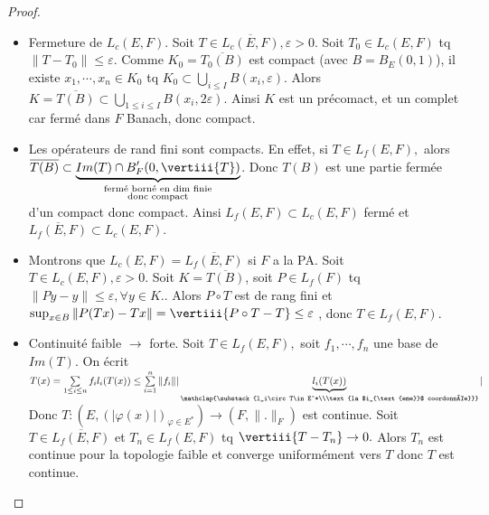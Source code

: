 \begin{proof}
    \begin{itemize}
        \item Fermeture de $L_c(E,F)$. Soit $T\in \overline{L_c(E,F)}, \varepsilon >0$. Soit $T_0\in L_c(E,F)$ tq $\|T-T_0\|\le \varepsilon .$ Comme $K_0=\overline{T_0(B)}$ est compact (avec $B=B_E(0,1)$), il existe $x_1,\cdots,x_n\in K_0$ tq $K_0\subset \bigcup\limits_{i\le  I}B(x_i,\varepsilon ).$ Alors $K=\overline{T(B)}\subset \bigcup\limits_{1\le i\le I} B(x_i,2\varepsilon )$. Ainsi $K$ est un précomact, et un complet car fermé dans $F$ Banach, donc compact.
    \item Les opérateurs de rand fini sont compacts. En effet, si $T\in L_f(E,F),$ alors $\overline{T(B)}\subset \underbrace{Im(T)\cap B'_F(0, \vertiii{T})}_{\substack{\text{fermé borné en dim finie}\\\text{donc compact}}}$. Donc $T(B)$ est une partie fermée d'un compact donc compact. Ainsi $L_f(E,F)\subset L_c(E,F)$ fermé et $\overline{L_f(E,F)}\subset L_c(E,F)$.
    \item Montrons que $L_c(E,F)=\overline{L_f(E,F)}$ si $F$ a la PA. Soit $T\in L_c(E,F),\varepsilon >0.$ Soit $K=\overline{T(B)}$, soit $P\in L_f(F)$ tq $\|Py -y\|\le \varepsilon ,\forall y\in K.  $. Alors $P\circ T$ est de rang fini et $\sup_{x\in B}\|P(Tx)-Tx\|=\vertiii{P\circ T-T}\le \varepsilon $ , donc $T\in L_f(E,F).$
    \item Continuité faible $\to $ forte. Soit $T\in L_f(E,F),$ soit $f_1,\cdots,f_n$ une base de $Im(T).$ On écrit $T(x)=\sum\limits_{1\le i\le n}^{} f_il_i(T(x))\le \sum\limits_{i=1}^{n} \|f_i\||\underbrace{l_i(T(x))}_{\mathclap{\substack{l_i\circ T\in E^*\\\text{la $i_{\text{eme}}$ coordonnée}}}}| $ Donc $T:\left( E,\left( | \varphi (x)|  \right) _{\varphi \in E^*} \right) \to \left( F,\|.\|_F \right) $ est continue. Soit $T\in \overline{L_f(E,F)}$ et $T_n\in L_f(E,F)$ tq $\vertiii{T-T_n}\to 0.$ Alors $T_n$ est continue pour la topologie faible et converge uniformément vers $T$ donc $T$ est continue.
    \end{itemize}
\end{proof}
